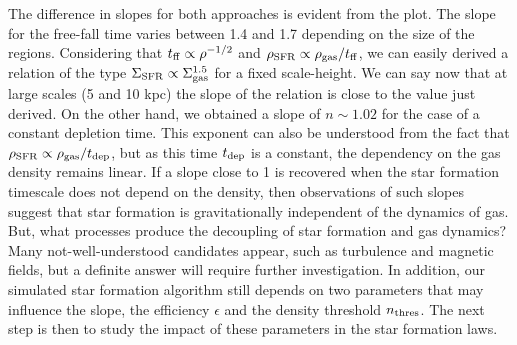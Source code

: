 \documentclass[twocolumn]{aastex}
\newcommand{\ssfr}{\Sigma_{\rm SFR}}
\newcommand{\tdep}{t_{\rm dep}}
\newcommand{\tff}{t_{\rm ff}}
\newcommand{\sgas}{\Sigma_{\rm gas}}
\begin{document}
The difference in slopes for both approaches is evident from the plot. The slope for the free-fall time varies between 1.4 and 1.7 depending on the size of the regions. Considering that $\tff \propto \rho^{-1/2}$ and $\rho_{\rm SFR} \propto \rho_{\rm gas} / \tff$, we can easily derived a relation of the type $\ssfr \propto \sgas^{1.5}$ for a fixed scale-height. We can say now that at large scales (5 and 10 kpc) the slope of the relation is close to the value just derived. On the other hand, we obtained a slope of $n \sim 1.02$ for the case of a constant depletion time. This exponent can also be understood from the fact that $\rho_{\rm SFR} \propto \rho_{\rm gas} / \tdep$, but as this time $\tdep$ is a constant, the dependency on the gas density remains linear. If a slope close to 1 is recovered when the star formation timescale does not depend on the density, then observations of such slopes suggest that star formation is gravitationally independent of the dynamics of gas. But, what processes produce the decoupling of star formation and gas dynamics? Many not-well-understood candidates appear, such as turbulence and magnetic fields, but a definite answer will require further investigation. In addition, our simulated star formation algorithm still depends on two parameters that may influence the slope, the efficiency $\epsilon$ and the density threshold $n_{\rm thres}$. The next step is then to study the impact of these parameters in the star formation laws.
\end{document}
